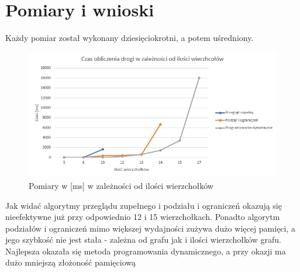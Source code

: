 \documentclass{article}
\begin{document}
\section{Pomiary i wnioski}
Każdy pomiar został wykonany dziesięciokrotni, a potem uśredniony.

    	\begin{figure}[h]
			\begin{center}
      			\includegraphics[width=1\textwidth]{./w.jpg}
      				\caption{Pomiary w [ms] w zależności od ilości wierzchołków}
      			\label{fig:obraz}
			\end{center}
		\end{figure}

Jak widać algorytmy przeglądu zupełnego i podziału i ograniczeń okazują się nieefektywne już przy odpowiednio 12 i 15 wierzchołkach. Ponadto algorytm podziałów i ograniczeń mimo większej wydajności zużywa dużo więcej pamięci, a jego szybkość nie jest stała - zależna od grafu jak i ilości wierzchołków grafu. Najlepsza okazała się metoda programowania dynamicznego, a przy okazji ma dużo mniejszą złożoność pamięciową 
\end{document}
